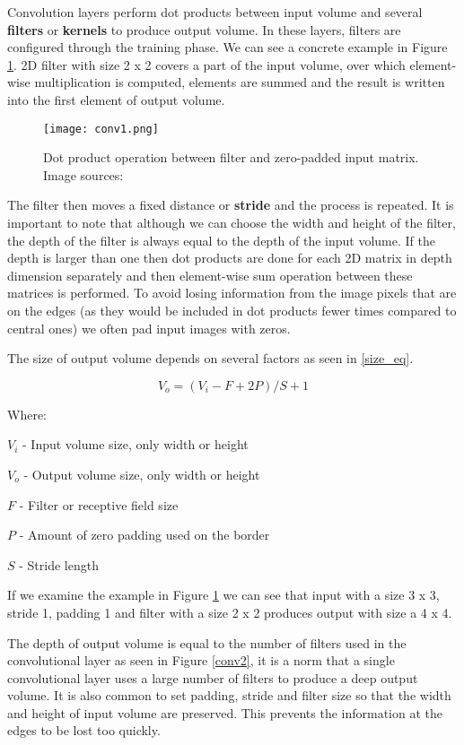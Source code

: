 Convolution layers perform dot products between input volume and several \textbf{filters} or \textbf{kernels} to produce output volume.
In these layers, filters are configured through the training phase.
We can see a concrete example in Figure \ref{conv1}.
2D filter with size 2 x 2 covers a part of the input volume, over which element-wise multiplication is computed, elements are summed and the result is written into the first element of output volume.

\begin{figure}[ht] 
    \centering
    \texttt{[image: conv1.png]} 
\caption[Dot product operation between filter and zero-padded input matrix.] {Dot product operation between filter and zero-padded input matrix. Image sources: \cite{conv_layer_img}}
    \label{conv1}
\end{figure}

The filter then moves a fixed distance or \textbf{stride} and the process is repeated.
It is important to note that although we can choose the width and height of the filter, the depth of the filter is always equal to the depth of the input volume.
If the depth is larger than one then dot products are done for each 2D matrix in depth dimension separately and then element-wise sum operation between these matrices is performed.
To avoid losing information from the image pixels that are on the edges (as they would be included in dot products fewer times compared to central ones) we often pad input images with zeros.

The size of output volume depends on several factors as seen in \ref{size_eq}.

\begin{equation}\label{size_eq}
V_{o} = (V_{i} - F + 2P) / S + 1
\end{equation}

Where:

$V_{i}$ - Input volume size, only width or height

$V_{o}$ - Output volume size, only width or height

$F$ - Filter or receptive field size

$P$ - Amount of zero padding used on the border

$S$ - Stride length

If we examine the example in Figure \ref{conv1} we can see that input with a size 3 x 3, stride 1, padding 1 and filter with a size 2 x 2 produces output with size a 4 x 4.

The depth of output volume is equal to the number of filters used in the convolutional layer as seen in Figure \ref{conv2}, it is a norm that a single convolutional layer uses a large number of filters to produce a deep output volume\cite{cs231n}.
It is also common to set padding, stride and filter size so that the width and height of input volume are preserved.
This prevents the information at the edges to be lost too quickly\cite{cs231n}.


